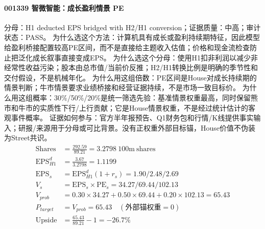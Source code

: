 \paragraph{001339 智微智能：成长盈利情景 PE}
分母：H1 deducted EPS bridged with H2/H1 conversion；证据质量：中高；审计状态：PASS。
为什么选这个方法：计算机具有成长或盈利持续期特征，因此模型给盈利桥接配置较高PE区间，而不是直接给主题收入估值；价格和现金流检查防止把泛化成长叙事直接变成EPS。
为什么选这个分母：使用H1扣非利润以减少非经常性收益污染；股本由总市值/当前价反推；H2/H1转换比例是明确的季节性和交付假设，不是机械年化。
为什么用这组倍数：PE区间是House对成长持续期的情景判断；牛市情景要求业绩桥接和经营证据持续，不是市场一致目标价。
为什么用这组概率：30\%/50\%/20\%是统一筛选先验：基准情景权重最高，同时保留熊市和牛市的实质性下行/上行贡献；它是House情景权重，不是经过统计估计的客观事件概率。
证据如何参与：官方半年报预告、Q1财务包和行情/K线提供事实输入；研报/来源用于分母或可比背景。没有正权重外部目标锚，House价值不伪装为Street共识。
\begin{align*}
\mathrm{Shares} &= \frac{292.59}{89.21}=3.2798\ \mathrm{100m\ shares}\\
\mathrm{EPS}_{H1}^d &= \frac{3.67}{3.2798}=1.1199\\
\mathrm{EPS}_s &= \mathrm{EPS}_{H1}^d(1+r_s)=1.90/2.48/2.69\\
V_s &= \mathrm{EPS}_s\times \mathrm{PE}_s=34.27/69.44/102.13\\
V_{prob} &= 0.30\times 34.27+0.50\times 69.44+0.20\times 102.13=65.43\\
P_{target} &= V_{prob}=65.43\quad(\text{外部锚权重}=0)\\
\mathrm{Upside} &= \frac{65.43}{89.21}-1=-26.7\%\\
\end{align*}

